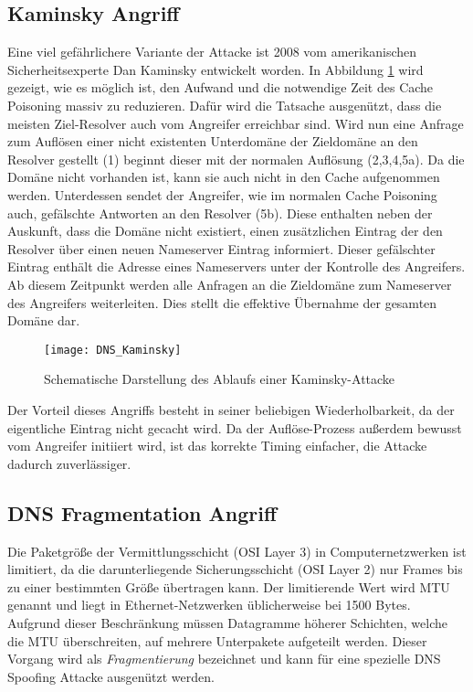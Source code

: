 \subsection{Kaminsky Angriff}
Eine viel gefährlichere Variante der Attacke ist 2008 vom amerikanischen Sicherheitsexperte Dan Kaminsky entwickelt worden\cite{Son2010}. In Abbildung \ref{img:dnskaminsky} wird gezeigt, wie es möglich ist, den Aufwand und die notwendige Zeit des Cache Poisoning massiv zu reduzieren. Dafür wird die Tatsache ausgenützt, dass die meisten Ziel-Resolver auch vom Angreifer erreichbar sind. Wird nun eine Anfrage zum Auflösen einer nicht existenten Unterdomäne der Zieldomäne an den Resolver gestellt (1) beginnt dieser mit der normalen Auflösung (2,3,4,5a). Da die Domäne nicht vorhanden ist, kann sie auch nicht in den Cache aufgenommen werden. Unterdessen sendet der Angreifer, wie im normalen Cache Poisoning auch, gefälschte Antworten an den Resolver (5b). Diese enthalten neben der Auskunft, dass die Domäne nicht existiert, einen zusätzlichen Eintrag der den Resolver über einen neuen Nameserver Eintrag informiert. Dieser gefälschter Eintrag enthält die Adresse eines Nameservers unter der Kontrolle des Angreifers. Ab diesem Zeitpunkt werden alle Anfragen an die Zieldomäne zum Nameserver des Angreifers weiterleiten. Dies stellt die effektive Übernahme der gesamten Domäne dar.

\begin{figure}[!hb]
    \centering
    \texttt{[image: DNS\_Kaminsky]}
    \caption{Schematische Darstellung des Ablaufs einer Kaminsky-Attacke}
    \label{img:dnskaminsky}
\end{figure}

Der Vorteil dieses Angriffs besteht in seiner beliebigen Wiederholbarkeit, da der eigentliche Eintrag nicht gecacht wird. Da der Auflöse-Prozess außerdem bewusst vom Angreifer initiiert wird, ist das korrekte Timing einfacher, die Attacke dadurch zuverlässiger.

\subsection{DNS Fragmentation Angriff}
Die Paketgröße der Vermittlungsschicht (OSI Layer 3) in Computernetzwerken ist limitiert, da die darunterliegende Sicherungsschicht (OSI Layer 2) nur Frames bis zu einer bestimmten Größe übertragen kann. Der limitierende Wert wird \ac{MTU} genannt und liegt in Ethernet-Netzwerken üblicherweise bei 1500 Bytes. Aufgrund dieser Beschränkung müssen Datagramme höherer Schichten, welche die MTU überschreiten, auf mehrere Unterpakete aufgeteilt werden. Dieser Vorgang wird als \textit{Fragmentierung} bezeichnet und kann für eine spezielle DNS Spoofing Attacke ausgenützt werden.

